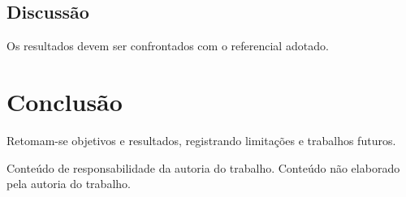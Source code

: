 \documentclass[12pt]{report}
\begin{document}
\section{Discussão}
Os resultados devem ser confrontados com o referencial adotado.

\chapter{Conclusão}
Retomam-se objetivos e resultados, registrando limitações e trabalhos futuros.

\ABNTEXacademicopostextual
\ABNTEXbibliografia
\ABNTEXglossario
{}
Conteúdo de responsabilidade da autoria do trabalho.
Conteúdo não elaborado pela autoria do trabalho.
\end{document}

